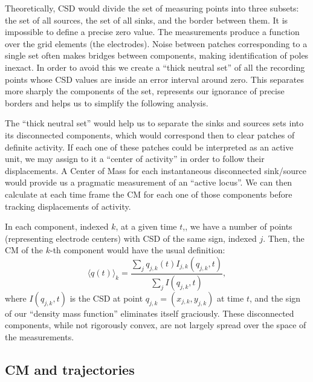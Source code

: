 \documentclass[11pt, letterpaper]{article}
\begin{document}
Theoretically, CSD would divide the set of measuring points into three subsets: the set of all sources, the set of all sinks, and the border between them.
It is impossible to define a precise zero value.
The measurements produce a function over the grid elements (the electrodes).
Noise between patches corresponding to a single set often makes bridges
between components, making identification of poles inexact.
In order to avoid this we create a ``thick neutral set'' of all the recording
points whose CSD values are inside an error interval around zero.
This separates more sharply the components of the set,
represents our ignorance of precise borders and helps
us to simplify the following analysis.

The ``thick neutral set'' would help us to separate the sinks and sources sets into
its disconnected components, which would correspond then to clear patches of
definite activity. If each one of these patches could be
interpreted as an active unit,
we may assign to it a ``center of activity'' in order to follow their displacements.
A Center of Mass for each instantaneous disconnected sink/source would provide us
a pragmatic measurement of an ``active locus''. We can then calculate at each time
frame the CM for each one of those components before tracking displacements of activity.

In each component, indexed $k$, at a given time $t$,, we have a number of points
(representing electrode centers)
with CSD of the same sign, indexed $j$. Then, the CM of the $k$-th
component would have the usual definition:
\begin{equation}\label{cmparadisj}
   \langle q(t) \rangle_k =\frac{\sum_j q_{j,k} (t) I_{j,k} (q_{j,k},t)}
           {\sum_j I(q_{j,k},t)},
\end{equation}
where $I(q_{j,k},t)$ is the CSD at point $q_{j,k}=(x_{j,k}, y_{j,k})$ at time $t$,
and the
sign of our ``density mass function'' eliminates itself graciously.
These disconnected components, while not rigorously convex,
are not largely spread over the space of the measurements.



\subsection{CM and trajectories}
\end{document}
